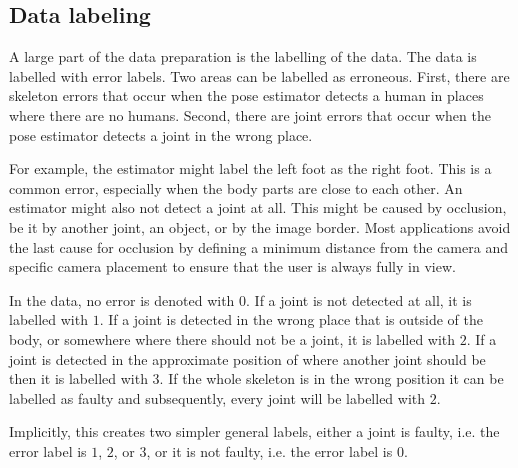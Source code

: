 \subsection{Data labeling}
\label{sec:data_labeling}

A large part of the data preparation is the labelling of the data. The data is labelled with error labels. Two areas can be labelled as erroneous. First, there are skeleton errors that occur when the pose estimator detects a human in places where there are no humans. Second, there are joint errors that occur when the pose estimator detects a joint in the wrong place. 

For example, the estimator might label the left foot as the right foot. This is a common error, especially when the body parts are close to each other. An estimator might also not detect a joint at all. This might be caused by occlusion, be it by another joint, an object, or by the image border. Most applications avoid the last cause for occlusion by defining a minimum distance from the camera and specific camera placement to ensure that the user is always fully in view.

In the data, no error is denoted with $0$. If a joint is not detected at all, it is labelled with $1$. If a joint is detected in the wrong place that is outside of the body, or somewhere where there should not be a joint, it is labelled with $2$. If a joint is detected in the approximate position of where another joint should be then it is labelled with $3$. If the whole skeleton is in the wrong position it can be labelled as faulty and subsequently, every joint will be labelled with $2$.

Implicitly, this creates two simpler general labels, either a joint is faulty, i.e. the error label is $1$, $2$, or $3$, or it is not faulty, i.e. the error label is $0$.